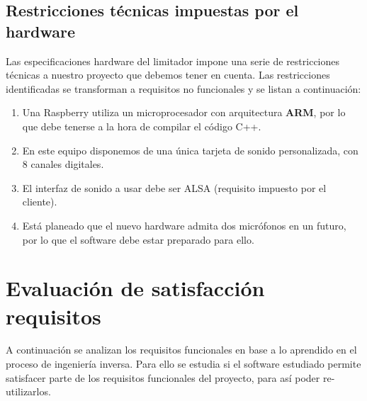 
\subsection{Restricciones técnicas impuestas por el hardware}

Las especificaciones hardware del limitador impone una serie de restricciones técnicas a nuestro proyecto que debemos tener en cuenta. Las restricciones identificadas se transforman a requisitos no funcionales y se listan a continuación:

\begin{enumerate}
	\item Una Raspberry utiliza un microprocesador con arquitectura \textbf{\acrshort{ARM}}, por lo que debe tenerse a la hora de compilar el código C++.

	\item En este equipo disponemos de una única tarjeta de sonido personalizada, con 8 canales digitales.

	\item El interfaz de sonido a usar debe ser \acrshort{ALSA} (requisito impuesto por el cliente).

	\item Está planeado que el nuevo hardware admita dos micrófonos en un futuro, por lo que el software debe estar preparado para ello.
\end{enumerate}


\section{Evaluación de satisfacción requisitos}

A continuación se analizan los requisitos funcionales en base a lo aprendido en el proceso de ingeniería inversa. Para ello se estudia si el software estudiado permite satisfacer parte de los requisitos funcionales del proyecto, para así poder re-utilizarlos.

